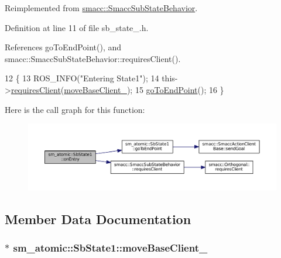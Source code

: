 Reimplemented from \hyperlink{classsmacc_1_1SmaccSubStateBehavior_a47eb8983afa8e1d312873a9a297b84f3}{smacc\+::\+Smacc\+Sub\+State\+Behavior}.



Definition at line 11 of file sb\+\_\+state\+\_.\+h.



References go\+To\+End\+Point(), and smacc\+::\+Smacc\+Sub\+State\+Behavior\+::requires\+Client().


\begin{DoxyCode}
12     \{
13         ROS\_INFO(\textcolor{stringliteral}{"Entering State1"});
14         this->\hyperlink{classsmacc_1_1SmaccSubStateBehavior_ae8361a9e794b02f9f3d962b881e4fd7d}{requiresClient}(\hyperlink{structsm__atomic_1_1SbState1_a4fd1f56e000ae75c78903b338cf4c189}{moveBaseClient\_});
15         \hyperlink{structsm__atomic_1_1SbState1_abea75039dfd4bdcde294d9970972c8f5}{goToEndPoint}();
16     \}
\end{DoxyCode}


Here is the call graph for this function\+:
\nopagebreak
\begin{figure}[H]
\begin{center}
\leavevmode
\includegraphics[width=350pt]{structsm__atomic_1_1SbState1_a92129ca822feec753ba87a7a90f4ed18_cgraph}
\end{center}
\end{figure}




\subsection{Member Data Documentation}
\subsubsection[{\texorpdfstring{move\+Base\+Client\+\_\+}{moveBaseClient_}}]{$\ast$ sm\+\_\+atomic\+::\+Sb\+State1\+::move\+Base\+Client\+\_\+}\hypertarget{structsm__atomic_1_1SbState1_a4fd1f56e000ae75c78903b338cf4c189}{}\label{structsm__atomic_1_1SbState1_a4fd1f56e000ae75c78903b338cf4c189}


